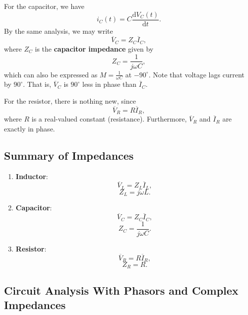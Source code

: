 \documentclass[11pt]{article}
\theoremstyle{plain} %
\theoremstyle{definition}
\theoremstyle{example}
\theoremstyle{remark}
\begin{document}
For the capacitor, we have 
$$i_C(t) = C\frac{\mathrm d V_C(t)}{\mathrm d t}.$$
By the same analysis, we may write 
$$\overline{V}_C = Z_C\overline{I}_C,$$
where $Z_C$ is the \textbf{capacitor impedance} given by 
$$Z_C = \frac{1}{j \omega C},$$
which can also be expressed as $M =\frac{1}{\omega C}$ at $-90^{\circ}$. 
Note that voltage lags current by $90^{\circ}$. That is, $\overline V_C$ is $90^{\circ}$ less in phase than $\overline I_C$. 

For the resistor, there is nothing new, since 
$$\overline V_R = R \overline I_R,$$
where $R$ is a real-valued constant (resistance). Furthermore, $\overline V_R$ and $\overline I_R$ are exactly in phase. 

\subsection{Summary of Impedances}
\begin{enumerate}
	\item \textbf{Inductor}:
		$$\overline V_L = Z_L\overline I_L,$$
		$$Z_L = j \omega L.$$
	\item \textbf{Capacitor}:
		$$\overline V_C = Z_C\overline I_C,$$
		$$Z_C = \frac{1}{j\omega C}.$$
	\item \textbf{Resistor}:
		$$\overline{V}_R = R\overline I_R,$$
		$$Z_R = R.$$
\end{enumerate}
\subsection{Circuit Analysis With Phasors and Complex Impedances}
\end{document}
